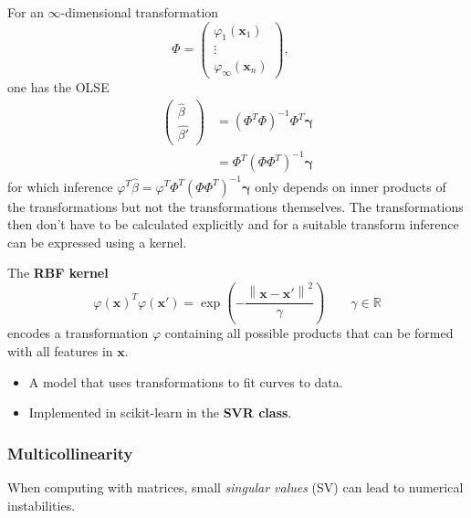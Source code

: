 
For an $\infty$-dimensional transformation
\begin{equation*}
    \Phi =
    \begin{pmatrix}
        \varphi_1(\mathbf{x}_1) \\
        \vdots                  \\
        \varphi_\infty(\mathbf{x}_n)
    \end{pmatrix},\quad
\end{equation*}
one has the OLSE
\begin{align*}
    \begin{pmatrix}
        \widehat{\beta} \\
        \widehat{\beta'}
    \end{pmatrix} & ={(\Phi^T \Phi)}^{-1}\Phi^T\boldsymbol{\gamma}    \\
                     & =\Phi^T{(\Phi \Phi^T)}^{-1}\boldsymbol{\gamma}
\end{align*}
for which inference $\varphi^T \widehat{\beta} = \varphi^T \Phi^T{(\Phi \Phi^T)}^{-1}\boldsymbol{\gamma}$ only depends on inner products of the transformations but not the transformations themselves. The transformations then don't have to be calculated explicitly and for a suitable transform inference can be expressed using a kernel.

The \textbf{RBF kernel}
\begin{equation*}
    {\varphi(\mathbf{x})}^T\varphi(\mathbf{x}')=\exp\left(-\frac{\left\|\mathbf{x}-\mathbf{x}'\right\|^{2}}{\gamma}\right) \qquad \gamma \in \mathbb{R}
\end{equation*}
encodes a transformation $\varphi$ containing all possible products that can be formed with all features in $\mathbf{x}$.


\begin{itemize}
    \item A model that uses transformations to fit curves to data.
    \item Implemented in scikit-learn in the \textbf{SVR class}.
\end{itemize}


\subsubsection{Multicollinearity}
When computing with matrices, small \textit{singular values} (SV) can lead to numerical instabilities.

